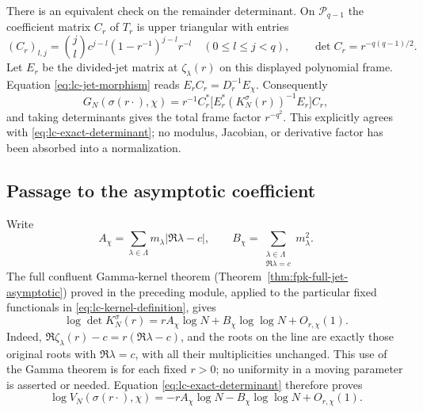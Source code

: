 There is an equivalent check on the remainder determinant. On
$\mathcal P_{q-1}$ the coefficient matrix $C_r$ of $T_r$ is upper triangular
with entries
\[
 (C_r)_{l,j}=\binom jl c^{j-l}(1-r^{-1})^{j-l}r^{-l}
 \quad(0\le l\le j<q),
 \qquad \det C_r=r^{-q(q-1)/2}.
 \tag{LC.16}\label{eq:lc-coefficient-map}
\]
Let $E_r$ be the divided-jet matrix at $\zeta_\lambda(r)$ on this displayed
polynomial frame. Equation \eqref{eq:lc-jet-morphism} reads
$E_rC_r=D_r^{-1}E_\chi$. Consequently
\[
 G_N(\sigma(r\cdot),\chi)
 =r^{-1}C_r^*\bigl[E_r^*(K_N^\sigma(r))^{-1}E_r\bigr]C_r,
\]
and taking determinants gives the total frame factor $r^{-q^2}$.
This explicitly agrees with \eqref{eq:lc-exact-determinant}; no modulus,
Jacobian, or derivative factor has been absorbed into a normalization.

\subsection{Passage to the asymptotic coefficient}

Write
\[
 A_\chi=\sum_{\lambda\in\Lambda}m_\lambda|\Re\lambda-c|,
 \qquad
 B_\chi=\sum_{\substack{\lambda\in\Lambda\\\Re\lambda=c}}
 m_\lambda^2.
 \tag{LC.17}\label{eq:lc-coefficients}
\]
The full confluent Gamma-kernel theorem
(Theorem~\ref{thm:fpk-full-jet-asymptotic}) proved in the preceding module,
applied to the particular fixed functionals in
\eqref{eq:lc-kernel-definition}, gives
\[
 \log\det K_N^\sigma(r)
 =rA_\chi\log N+B_\chi\log\log N+O_{r,\chi}(1).
 \tag{LC.18}\label{eq:lc-inherited-kernel-law}
\]
Indeed, $\Re\zeta_\lambda(r)-c=r(\Re\lambda-c)$, and the roots on the
line are exactly those original roots with $\Re\lambda=c$, with all their
multiplicities unchanged. This use of the Gamma theorem is for each fixed
$r>0$; no uniformity in a moving parameter is asserted or needed.
Equation \eqref{eq:lc-exact-determinant} therefore proves
\[
 \log V_N(\sigma(r\cdot),\chi)
 =-rA_\chi\log N-B_\chi\log\log N+O_{r,\chi}(1).
 \tag{LC.19}\label{eq:lc-dilated-asymptotic}
\]


